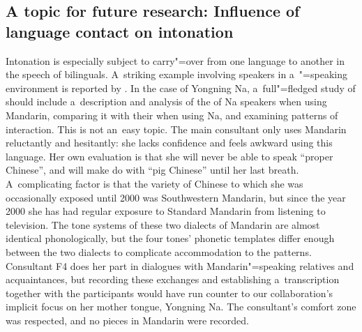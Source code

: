\subsection{A topic for future research: Influence of language contact on intonation}
\label{sec:presentdaysociolinguisticsituationofyongningnacontactwithacomplextonesystemmandarinchinese}
\label{sec:presentdaysociolinguisticsituationeffectsontone}
\label{sec:presentdaysociolinguisticsituationeffectsonintonation}

Intonation is especially subject to carry"=over from one language to another in the speech of bilinguals. A~striking example involving  speakers in a~"=speaking environment is reported by \citet[401]{dungetal1998}. In the case of Yongning Na, a~full"=fledged study of  should include a~description and analysis of the  of Na speakers when using {Mandarin}, comparing it with their  when using Na, and examining patterns of interaction. This is not an~easy topic. The main consultant only uses {Mandarin} reluctantly and hesitantly: she lacks confidence and feels awkward using this language. Her own evaluation is that she will never be able to speak “proper Chinese'', and will make do with “pig Chinese'' until her last breath. A~complicating factor is that the variety of Chinese to which she was occasionally exposed until 2000 was Southwestern Mandarin, but since the year 2000 she has had regular exposure to Standard Mandarin from listening to television. The tone systems of these two dialects of {Mandarin} are almost identical phonologically, but the four tones' phonetic templates differ enough between the two dialects to complicate accommodation to the  patterns. Consultant F4 does her part in dialogues with {Mandarin}"=speaking relatives and acquaintances, but recording these exchanges and establishing a~transcription together with the participants would have run counter to our collaboration's implicit focus on her mother tongue, Yongning Na. The consultant's comfort zone was respected, and no pieces in {Mandarin} were recorded. 

